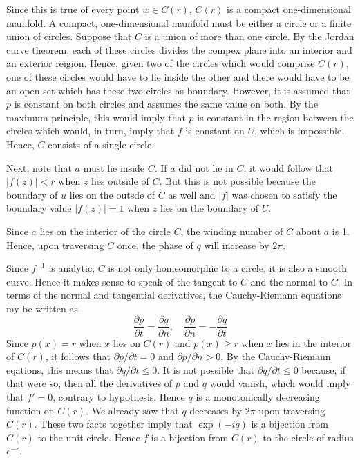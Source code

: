 \documentclass[12pt]{article}
\begin{document}
Since this is true of every point $w \in C(r)$, $C(r)$ is a compact one-dimensional manifold.  A compact, one-dimensional manifold must be either a circle or a finite union of circles.  Suppose that $C$ is a union of more than one circle.  By the Jordan curve theorem, each of these circles divides the compex plane into an interior and an exterior reigion.  Hence, given two of the circles which would comprise $C(r)$, one of these circles would have to lie inside the other and there would have to be an open set which has these two circles as boundary.  However, it is assumed that $p$ is constant on both circles and assumes the same value on both.  By the maximum principle, this would imply that $p$ is constant in the region between the circles which would, in turn, imply that $f$ is constant on $U$, which is impossible.  Hence, $C$ consists of a single circle.

Next, note that $a$ must lie inside $C$.  If $a$ did not lie in $C$, it would follow that $|f(z)|<r$ when $z$ lies outside of $C$.  But this is not possible because the boundary of $u$ lies on the outsde of $C$ as well and $|f|$ was chosen to satisfy the boundary value $|f(z)| = 1$ when $z$ lies on the boundary of $U$.

Since $a$ lies on the interior of the circle $C$, the winding number of $C$ about $a$ is 1.  Hence, upon traversing $C$ once, the phase of $q$ will increase by $2 \pi$.

Since $f^{-1}$ is analytic, $C$ is not only homeomorphic to a circle, it is also a smooth curve.  Hence it makes sense to speak of the tangent to $C$ and the normal to $C$.  In terms of the normal and tangential derivatives, the Cauchy-Riemann equations my be written as
 $$\frac{\partial p}{\partial t} = \frac{\partial q}{\partial n},\quad
 \frac{\partial p}{\partial n} = -\frac{\partial q}{\partial t}$$
Since $p(x) = r$ when $x$ lies on $C(r)$ and $p(x) \ge r$ when $x$ lies in the interior of $C(r)$, it follows that $\partial p / \partial t = 0$ and $\partial p / \partial n > 0$.  By the Cauchy-Riemann eqations, this means that $\partial q / \partial t \le 0$.  It is not possible that $\partial q / \partial t \le 0$ because, if that were so, then all the derivatives of $p$ and $q$ would vanish, which would imply that $f' = 0$, contrary to hypothesis.  Hence $q$ is a monotonically decreasing function on $C(r)$.  We already saw that $q$ decreases by $2 \pi$ upon traversing $C(r)$.  These two facts together imply that $\exp(-iq)$ is a bijection from $C(r)$ to the unit circle.  Hence $f$ is a bijection from $C(r)$ to the circle of radius $e^{-r}$.
\end{document}

